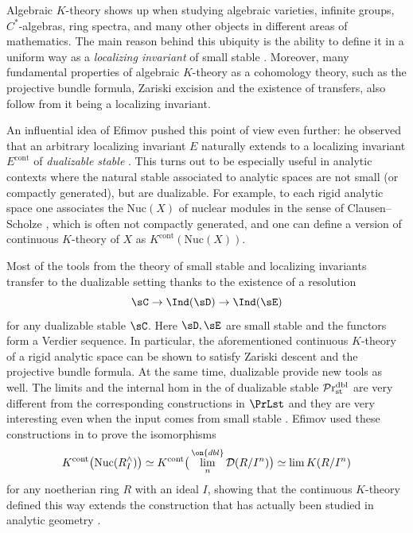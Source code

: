 \documentclass[a4paper,10pt, oneside]{amsart}
\begin{document}

Algebraic $K$-theory shows up when studying algebraic varieties, infinite groups, $C^*$-algebras, ring spectra, and many other 
objects in different areas of mathematics. The main reason behind this ubiquity is the ability to define it in a uniform way as a 
{\it localizing invariant} of small stable \infcats. Moreover, many fundamental properties of algebraic $K$-theory as a cohomology 
theory, such as the projective bundle formula, Zariski excision and the existence of transfers, also follow from it being a 
localizing invariant. %

An influential idea of Efimov \cite{HoyoisEfimov,efimov2024k} pushed this point of view even further: he observed that an 
arbitrary localizing invariant $E$ naturally extends to a localizing invariant $E^\mathrm{cont}$ of {\it dualizable stable 
\infcats}. This turns out to be especially useful in analytic contexts where the natural stable \infcats associated to analytic spaces are not 
small (or compactly generated), but are dualizable. For example, to each rigid analytic space one associates the \infcat $\mathrm{Nuc}(X)$ of nuclear modules in the sense of Clausen--Scholze \cite{scholze2026lecturesanalyticgeometry}, which is often not
compactly generated, and one can define a version of continuous $K$-theory of $X$ as 
$K^{\mathrm{cont}}(\mathrm{Nuc}(X))$. 

Most of the tools from the theory of small stable \infcats and localizing invariants transfer to the dualizable setting thanks to 
the existence of a resolution 
\[
	\sC \to \Ind(\sD) \to \Ind(\sE)
\]
for any dualizable stable \infcat $\sC$. Here $\sD, \sE$ are small stable \infcats and the functors form a Verdier sequence. 
In particular, the aforementioned continuous $K$-theory of a rigid analytic space can be shown to satisfy Zariski descent and the
projective bundle formula. At the same time, dualizable \infcats provide new tools as well. The limits and the internal hom in 
the \infcat of dualizable stable \infcats $\mathcal{P}\mathrm{r}_{\mathrm{st}}^{\mathrm{dbl}}$ are very different from the corresponding constructions in $\PrLst$ and 
they are very interesting even when the input comes from small stable \infcats. 
Efimov used these constructions in \cite{efimov2025localizinginvariantsinverselimits} to prove the isomorphisms 
\[
	K^{\mathrm{cont}}\big(\mathrm{Nuc}(R_I^\wedge)\big) \simeq K^{\mathrm{cont}}\big(\lim^{\on{dbl}}_n \mcd(R/I^n)\big) \simeq \lim K(R/I^n)
\]
for any noetherian ring $R$ with an ideal $I$, showing that the continuous $K$-theory defined this way extends the construction 
that has actually been studied in analytic geometry 
\cite{Wagoner1976,Bloch2013,morrow2016historicaloverviewprocdh,kerzsaitotamme}. 
\end{document}
